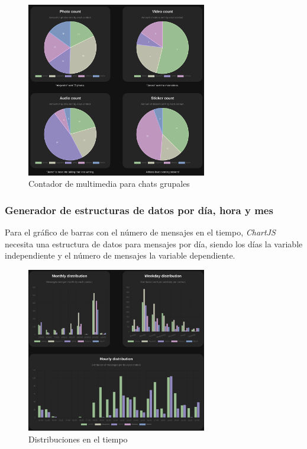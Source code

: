 \begin{figure}[h]
	\centering
	\includegraphics[width=0.7\textwidth]{img/media_count.png}
	\caption{Contador de multimedia para chats grupales}
	\label{fig:chap4:media_count}
\end{figure}

\subsubsection{Generador de estructuras de datos por día, hora y mes}

Para el gráfico de barras con el número de mensajes en el tiempo, \textit{ChartJS} necesita una estructura de datos para mensajes por día, siendo los días la variable independiente y el número de mensajes la variable dependiente.

\begin{figure}[H]
	\centering
	\includegraphics[width=0.7\textwidth]{img/time_distributions.png}
	\caption{Distribuciones en el tiempo}
	\label{fig:chap4:time_distributions}
\end{figure}

